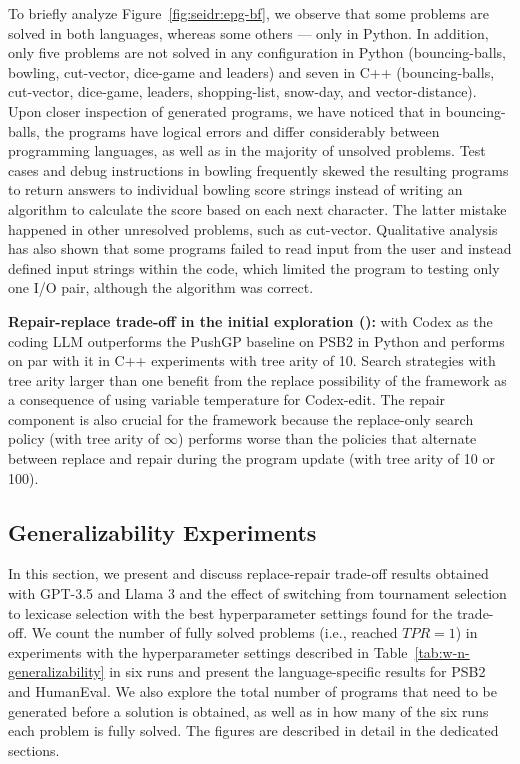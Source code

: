 To briefly analyze Figure~\ref{fig:seidr:epg-bf}, we observe that some problems are solved in both languages, whereas some others --- only in Python. 
In addition, only five problems are not solved in any \method{} configuration in Python (bouncing-balls, bowling, cut-vector, dice-game and leaders) and seven in C++ (bouncing-balls, cut-vector, dice-game,  leaders, shopping-list, snow-day, and vector-distance).
Upon closer inspection of generated programs, we have noticed that in bouncing-balls, the programs have logical errors and differ considerably between programming languages, as well as in the majority of unsolved problems. 
Test cases and debug instructions in bowling frequently skewed the resulting programs to return answers to individual bowling score strings instead of writing an algorithm to calculate the score based on each next character.
The latter mistake happened in other unresolved problems, such as cut-vector.
Qualitative analysis has also shown that some programs failed to read input from the user and instead defined input strings within the code, which limited the program to testing only one I/O pair, although the algorithm was correct.


\begin{framed}\noindent
\textbf{Repair-replace trade-off in the initial exploration (\rqtreearity{}):} 
\method{} with Codex as the coding LLM outperforms the PushGP baseline on PSB2 in Python and performs on par with it in C++ experiments with tree arity of 10. 
Search strategies with tree arity larger than one benefit from the replace possibility of the \method{} framework as a consequence of using variable temperature for Codex-edit.
The repair component is also crucial for the framework because the replace-only search policy (with tree arity of $\infty$) performs worse than the policies that alternate between replace and repair during the program update (with tree arity of 10 or 100).  
\end{framed} 


\subsection{Generalizability Experiments}

In this section, we present and discuss replace-repair trade-off results obtained with GPT-3.5 and Llama 3 and the effect of switching from tournament selection to lexicase selection with the best hyperparameter settings found for the trade-off. 
We count the number of fully solved problems (i.e., reached $TPR=1$) in experiments with the hyperparameter settings described in Table~\ref{tab:w-n-generalizability} in six runs and present the language-specific results for PSB2 and HumanEval.
We also explore the total number of programs that need to be generated before a solution is obtained, as well as
in how many of the six runs each problem is fully solved.
The figures are described in detail in the dedicated sections. 

